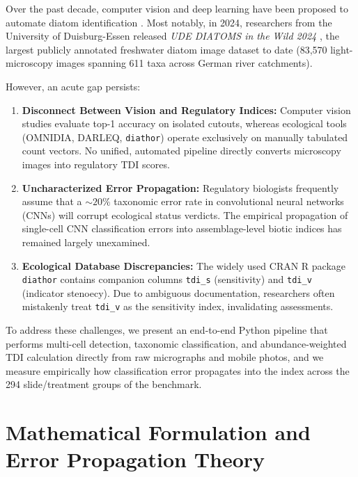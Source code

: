 \documentclass[10pt,twocolumn,a4paper]{article}
\begin{document}
Over the past decade, computer vision and deep learning have been proposed to automate diatom identification \cite{pedraza2017automated, kloster2020deep, tan2022diatom}. Most notably, in 2024, researchers from the University of Duisburg-Essen released \textit{UDE DIATOMS in the Wild 2024} \cite{venkataramanan2024ude}, the largest publicly annotated freshwater diatom image dataset to date (83,570 light-microscopy images spanning 611 taxa across German river catchments).

However, an acute gap persists:
\begin{enumerate}
    \item \textbf{Disconnect Between Vision and Regulatory Indices:} Computer vision studies evaluate top-1 accuracy on isolated cutouts, whereas ecological tools (OMNIDIA, DARLEQ, \texttt{diathor}) operate exclusively on manually tabulated count vectors. No unified, automated pipeline directly converts microscopy images into regulatory TDI scores.
    \item \textbf{Uncharacterized Error Propagation:} Regulatory biologists frequently assume that a $\sim 20\%$ taxonomic error rate in convolutional neural networks (CNNs) will corrupt ecological status verdicts. The empirical propagation of single-cell CNN classification errors into assemblage-level biotic indices has remained largely unexamined.
    \item \textbf{Ecological Database Discrepancies:} The widely used CRAN R package \texttt{diathor} contains companion columns \texttt{tdi\_s} (sensitivity) and \texttt{tdi\_v} (indicator stenoecy). Due to ambiguous documentation, researchers often mistakenly treat \texttt{tdi\_v} as the sensitivity index, invalidating assessments.
\end{enumerate}

To address these challenges, we present an end-to-end Python pipeline that performs multi-cell detection, taxonomic classification, and abundance-weighted TDI calculation directly from raw micrographs and mobile photos, and we measure empirically how classification error propagates into the index across the 294 slide/treatment groups of the benchmark.

\section{Mathematical Formulation and Error Propagation Theory}
\end{document}
